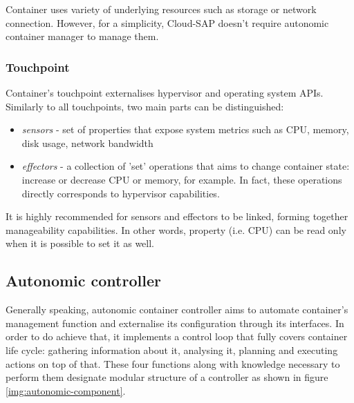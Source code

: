 Container uses variety of underlying resources such as storage or network connection. However, for a simplicity, Cloud-SAP doesn't require autonomic container manager to manage them.

\subsubsection{Touchpoint}
Container's touchpoint externalises hypervisor and operating system APIs. Similarly to all touchpoints, two main parts can be distinguished:
\begin{itemize}
 \item \emph{sensors} - set of properties that expose system metrics such as CPU, memory, disk usage, network bandwidth
 \item \emph{effectors} - a collection of 'set' operations that aims to change container state: increase or decrease CPU or memory, for example. In fact, these operations directly corresponds to hypervisor capabilities.
\end{itemize}

It is highly recommended for sensors and effectors to be linked, forming together manageability capabilities. In other words, property (i.e. CPU) can be read only when it is possible to set it as well. 

\subsection{Autonomic controller}
Generally speaking, autonomic container controller aims to automate container's management function and externalise its configuration through its interfaces. In order to do achieve that, it implements a control loop that fully covers container life cycle: gathering information about it, analysing it, planning and executing actions on top of that. These four functions along with knowledge necessary to perform them designate modular structure of a controller as shown in figure \ref{img:autonomic-component}.

